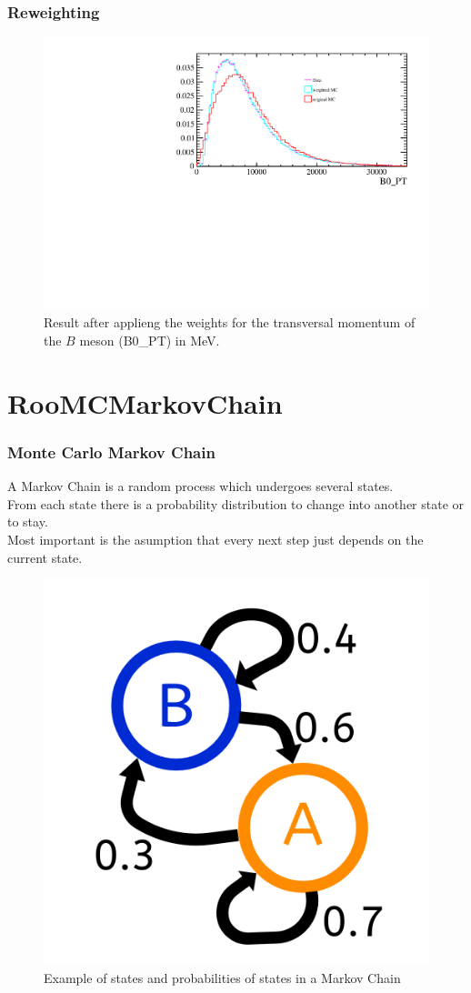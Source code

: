 \documentclass{beamer}
\begin{document}
\begin{frame}
  \frametitle{Reweighting}

  \begin{figure}
   \includegraphics[width=0.8\linewidth]{figures/B0_PT}
   \caption{Result after applieng the weights for the transversal momentum of the $B$ meson (B0\_PT) in MeV.}
  \end{figure}


\end{frame}



\section{RooMCMarkovChain}


\begin{frame}
 \frametitle{Monte Carlo Markov Chain}
 A Markov Chain is a random process which undergoes several states. \\
 From each state there is a probability distribution to change into another state or to stay. \\
 Most important is the asumption that every next step just depends on the current state.
 \begin{figure}
  \includegraphics[width=0.3\linewidth]{figures/MCMC_Chain}
  \caption{Example of states and probabilities of states in a Markov Chain}
 \end{figure}
\end{frame}
\end{document}
